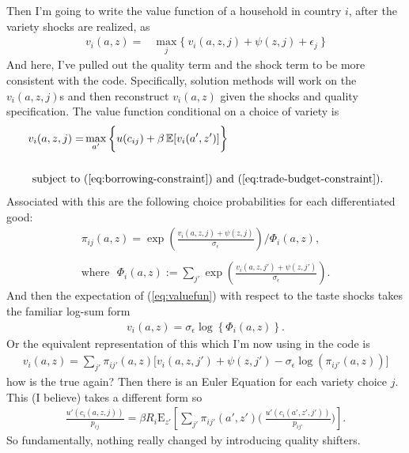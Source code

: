 \documentclass[12pt,pdftex]{article}
\begin{document}
\begin{onehalfspacing}
Then I'm going to write the value function of a household in country $i$, after the variety shocks are realized, as
\begin{align}
v_{i}(a, z) = &  \max_{j} \big  \{ \  v_{i}(a, z, j) + \psi(z, j) + \epsilon_{j} \ \big \}
\end{align}
And here, I've pulled out the quality term and the shock term to be more consistent with the code. Specifically, solution methods will work on the $v_{i}(a, z, j)$s and then reconstruct $v_{i}(a, z)$ given the shocks and quality specification. The value function conditional on a choice of variety is
\begin{align}
v_{i}(a, z, j) = &  \max_{\ a' \ }\bigg  \{ u(c_{ij}) + \beta \, \mathbb{E} [v_{i}(a', z')]  \bigg\}\\
\nonumber \\
\mbox{subject to}  \ & (\ref{eq:borrowing-constraint}) \  \mathrm{and} \ (\ref{eq:trade-budget-constraint}). \nonumber
\end{align}
Associated with this are the following choice probabilities for each differentiated good:
\begin{align}
\pi_{ij}(a, z) = \exp \left( \frac{ v_{i}(a, z, j) + \psi(z, j) }{\sigma_{\epsilon}} \right) \Bigg / \Phi_{i}(a,z), \\
\nonumber \\
\mbox{where} \ \ \ \Phi_{i}(a,z) := \sum_{j'} \exp \left( \frac{ v_{i}(a, z, j') + \psi(z, j') }{\sigma_{\epsilon}} \right).
\end{align}
And then the expectation of (\ref{eq:valuefun}) with respect to the taste shocks takes the familiar log-sum form
\begin{align}
v_i(a, z) = \sigma_{\epsilon} \log \left\{ \Phi_{i}(a,z)  \right\}.
\end{align}
Or the equivalent representation of this which I'm now using in the code is
\begin{align}
v_i(a, z) = \sum_{j'} \pi_{ij'}(a, z) \bigg[ v_{i}(a, z, j') + \psi(z, j') - \sigma_{\epsilon} \log (\pi_{ij'}(a, z))  \bigg]
\end{align}
how is the true again? Then there is an Euler Equation for each variety choice $j$. This (I believe) takes a different form so
\begin{align}
\frac{u'(c_{i}(a, z, j))}{p_{ij}} = \beta R_{i} \mathrm{E}_{z'} \left[ \sum_{j'} \pi_{ij'}(a', z') \bigg( \ \frac{u'(c_{i}(a', z', j'))}{p_{ij'}} \bigg) \right].
\end{align}
So fundamentally, nothing really changed by introducing quality shifters.


\end{onehalfspacing}
\end{document}
